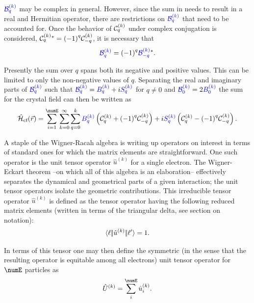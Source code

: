 \documentclass{article}
\begin{document}
    $\textcolor{blue}{\mathcal{B}^{(k)}_{q}}$ may be complex in general. However, since the sum in  needs to result in a real and Hermitian operator, there are restrictions on $\textcolor{blue}{\mathcal{B}^{(k)}_{q}}$ that need to be accounted for. Once the behavior of $\mathcal{C}^{(k)}_{q}$ under complex conjugation is considered, $\mathcal{C}^{(k)}_{q}{}^* = {(-1)}^{q}\mathcal{C}^{(k)}_{-q}$, it is necessary that
    \begin{equation}
    	\textcolor{blue}{\mathcal{B}^{(k)}_{q}} = {(-1)}^{q}\textcolor{blue}{\mathcal{B}^{(k)}_{-q}}^{*}.
    \end{equation}
    
    Presently the sum over $q$ spans both its negative and positive values. This can be limited to only the non-negative values of $q$. Separating the real and imaginary parts of $\textcolor{blue}{\mathcal{B}^{(k)}_{q}}$ such that $\textcolor{blue}{\mathcal{B}^{(k)}_{q}} = \textcolor{blue}{B^{(k)}_{q}} + i \textcolor{blue}{S^{(k)}_{q}}$ for $q\neq{0}$ and $\textcolor{blue}{\mathcal{B}^{(k)}_{0}} = 2\textcolor{blue}{B^{(k)}_{0}}$ the sum for the crystal field can then be written as
    \begin{equation}
        \hamCrystalFieldSymbol(\vec{r}) = 
        	\sum_{i=1}^\numE
        	\sum_{k=0}^\infty
        	\sum_{q=0}^{k} \Bkq{k}{q} \left(\Ckq{k}{q} + \phaser{q}\Ckq{k}{-q}\right) + i \Skq{k}{q} \left(\Ckq{k}{q} - \phaser{q}\Ckq{k}{-q}\right).
    \label{eqn:better crystal sum}
    \end{equation}
    
    A staple of the Wigner-Racah algebra is writing up operators on interest in terms of standard ones for which the matrix elements are straightforward.  One such operator is the unit tensor operator $\hat{u}^{(k)}$ for a single electron. The Wigner-Eckart theorem --on which all of this algebra is an elaboration-- effectively separates the dynamical and geometrical parts of a given interaction; the unit tensor operators isolate the geometric contributions. This irreducible tensor operator $\hat{u}^{(k)}$ is defined as the tensor operator having the following reduced matrix elements (written in terms of the triangular delta, see section on notation):
    \begin{equation}
    \langle \ell|\!|\hat{u}^{(k)}|\!|\ell'\rangle = 1.
    \end{equation}

    In terms of this tensor one may then define the symmetric (in the sense that the resulting operator is equitable among all electrons) unit tensor operator for $\numE$ particles as
    \begin{equation}
        \hat{U}^{(k)} = \sum_{i}^{\numE} \op{u}^{(k)}_i.
    \end{equation}
\end{document}
